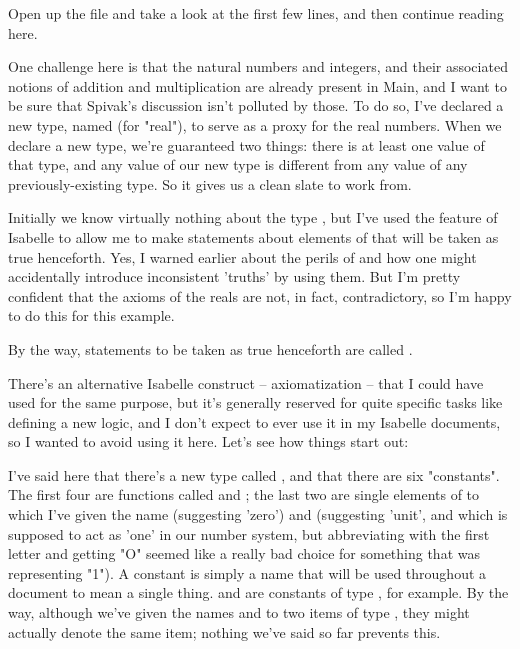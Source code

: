Open up the  file and take a look at the first few lines, and then continue reading here.

One challenge here is that the natural numbers and integers, and their associated notions of addition and multiplication are already present in Main, and I want to be sure that Spivak's discussion isn't polluted by those. To do so, I've declared a new type, named  (for "real"), to serve as a proxy for the real numbers. When we declare a new type, we're guaranteed two things: there is at least one value of that type, and any value of our new type is different from any value of any previously-existing type. So it gives us a clean slate to work from. 

Initially we know virtually nothing about the type , but I've used the  feature of Isabelle to allow me to make statements about elements of  that will be taken as true henceforth. Yes, I warned earlier about the perils of  and how one might accidentally introduce inconsistent 'truths' by using them. But I'm pretty confident that the axioms of the reals are not, in fact, contradictory, so I'm happy to do this for this example. 

By the way, statements to be taken as true henceforth are called . 

There's an alternative Isabelle construct -- axiomatization -- that I could have used for the same purpose, but it's generally reserved for quite specific tasks like defining a new logic, and I don't expect to ever use it in my Isabelle documents, so I wanted to avoid using it here. Let's see how things start out:

I've said here that there's a new type called , and that there are six "constants". The first four are functions called  and ; the last two are single elements of  to which I've given the name  (suggesting 'zero') and  (suggesting 'unit', and which is supposed to act as 'one' in our number system, but abbreviating with the first letter and getting "O" seemed like a really bad choice for something that was representing "1"). A constant is simply a name that will be used throughout a document to mean a single thing.  and  are constants of type , for example. By the way, although we've given the names  and  to two items of type , they might actually denote the same item; nothing we've said so far prevents this.

